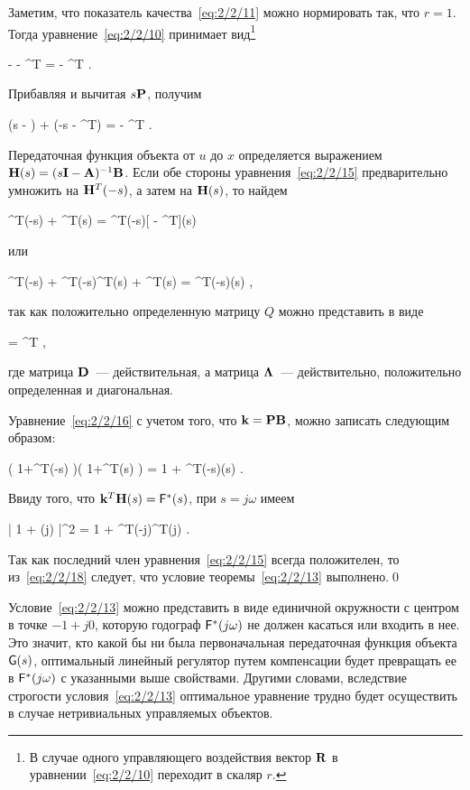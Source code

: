 Заметим, что показатель качества~\ref{eq:2/2/11} можно нормировать так, что $r=1$. Тогда уравнение~\ref{eq:2/2/10} принимает вид\footnote{ В случае одного управляющего воздействия вектор $\mathbf{R}$ в уравнении~\ref{eq:2/2/10} переходит в скаляр $r$. }

    -  - ^T =  -  ^T \mbox{.}
\eeq

Прибавляя и вычитая $s\mathbf{P}$, получим

    (s - ) + (-s - ^T) =  - ^T \mbox{.}
\eeq

Передаточная функция объекта от $u$ до $x$ определяется выражением $\mathbf{H}(s) = (s\mathbf{I}-\mathbf{A})^{-1}\mathbf{B}$. Если обе стороны уравнения~\vref{eq:2/2/15} предварительно умножить на $\mathbf{H}^T(-s)$, а затем на $\mathbf{H}(s)$, то найдем

\beqn
    ^T(-s)  + ^T(s) = ^T(-s)[ - ^T](s)
\eeqn

или

    ^T(-s) + ^T(-s)^T(s) + ^T(s) = ^T(-s)(s) \mbox{,}
\eeq

так как положительно определенную матрицу $Q$ можно представить в виде\cite{BELLMAN2}

\beqn
     = ^T\m{\Lambda} \mbox{,}
\eeqn

где матрица $\mathbf{D}$~--- действительная, а матрица $\mathbf{\Lambda}$~--- действительно, положительно определенная и диагональная.

Уравнение~\ref{eq:2/2/16} с учетом того, что $\mathbf{k} = \mathbf{P}\mathbf{B}$, можно записать следующим образом:

    \bigl( 1+^T(-s) \bigr)\bigl( 1+^T(s) \bigr) = 1 + ^T(-s)\m{\Lambda}(s) \mbox{.}
\eeq

Ввиду того, что $\mathbf{k}^T\mathbf{H}(s) = \mathsf{F}^{*}(s)$, при $s = j\omega$ имеем

    \bigl| 1 + \funcT(j\omega) \bigr|^2 = 1 + ^T(-j\omega)^T\m{\Lambda}(j\omega) \mbox{.}
\eeq

Так как последний член уравнения~\vref{eq:2/2/15} всегда положителен, то из~\ref{eq:2/2/18} следует, что условие теоремы~\ref{eq:2/2/13} выполнено.\qed

Условие~\ref{eq:2/2/13} можно представить в виде единичной окружности с центром в точке $-1 + j0$, которую годограф $\mathsf{F}^{*}(j\omega)$ не должен касаться или входить в нее. Это значит, кто какой бы ни была первоначальная передаточная функция объекта $\mathsf{G}(s)$, оптимальный линейный регулятор путем компенсации будет превращать ее в $\mathsf{F}^{*}(j\omega)$ с указанными выше свойствами. Другими словами, вследствие строгости условия~\vref{eq:2/2/13} оптимальное уравнение трудно будет осуществить в случае нетривиальных управляемых объектов.

